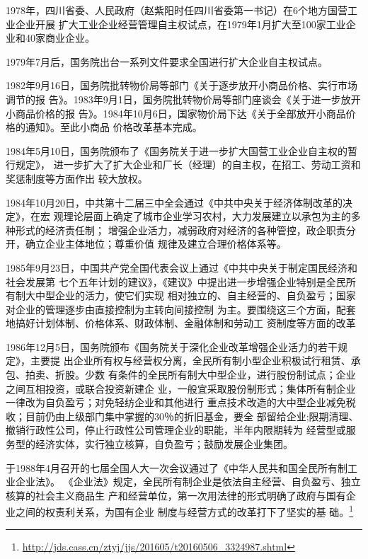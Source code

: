 1978年，四川省委、人民政府（赵紫阳时任四川省委第一书记）在6个地方国营工业企业开展
扩大工业企业经营管理自主权试点，在1979年1月扩大至100家工业企业和40家商业企业。

1979年7月后，国务院出台一系列文件要求全国进行扩大企业自主权试点。

1982年9月16日，国务院批转物价局等部门《关于逐步放开小商品价格、实行市场调节的报
告》。1983年9月1日，国务院批转物价局等部门座谈会《关于进一步放开小商品价格的报
告》。1984年10月6日，国家物价局下达《关于全部放开小商品价格的通知》。至此小商品
价格改革基本完成。


1984年5月10日，国务院颁布了《国务院关于进一步扩大国营工业企业自主权的暂行规定》，
进一步扩大了扩大企业和厂长（经理）的自主权，在招工、劳动工资和奖惩制度等方面作出
较大放权。

1984年10月20日，中共第十二届三中全会通过《中共中央关于经济体制改革的决定》，在宏
观理论层面上确定了城市企业学习农村，大力发展建立以承包为主的多种形式的经济责任制；
增强企业活力，减弱政府对经济的各种管控，政企职责分开，确立企业主体地位；尊重价值
规律及建立合理价格体系等。

1985年9月23日，中国共产党全国代表会议上通过《中共中央关于制定国民经济和社会发展第
七个五年计划的建议》，《建议》中提出进一步增强企业特别是全民所有制大中型企业的活力，使它们实现
相对独立的、自主经营的、自负盈亏；国家对企业的管理逐步由直接控制为主转向间接控制
为主。要围绕这三个方面，配套地搞好计划体制、价格体系、财政体制、金融体制和劳动工
资制度等方面的改革

1986年12月5日，国务院颁布《国务院关于深化企业改革增强企业活力的若干规定》，主要提
出企业所有权与经营权分离，全民所有制小型企业积极试行租赁、承包、拍卖、折股。少数
有条件的全民所有制大中型企业，进行股份制试点；企业之间互相投资，或联合投资新建企
业，一般宜采取股份制形式；集体所有制企业一律改为自负盈亏；对免轻纺企业和其他进行
重点技术改造的大中型企业减免税收；目前仍由上级部门集中掌握的30％的折旧基金，要全
部留给企业;限期清理、撤销行政性公司，停止行政性公司管理企业的职能，半年内限期转为
经营型或服务型的经济实体，实行独立核算，自负盈亏；鼓励发展企业集团。

于1988年4月召开的七届全国人大一次会议通过了《中华人民共和国全民所有制工业企业法》。
《企业法》规定，全民所有制企业是依法自主经营、自负盈亏、独立核算的社会主义商品生
产和经营单位，第一次用法律的形式明确了政府与国有企业之间的权责利关系，为国有企业
制度与经营方式的改革打下了坚实的基
础。\footnote{\url{http://jds.cass.cn/ztyj/jjs/201605/t20160506_3324987.shtml}}

